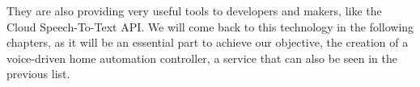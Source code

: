 They are also providing very useful tools to developers and makers, like the Cloud Speech-To-Text API. We will come back to this
technology in the following chapters, as it will be an essential part to achieve our objective, the creation of a voice-driven home
automation controller, a service that can also be seen in the previous list.
